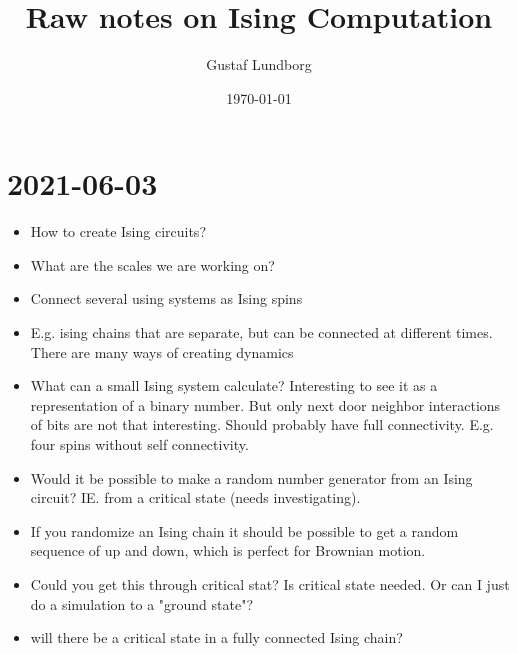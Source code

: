 \documentclass[11pt]{article}
\title{Raw notes on Ising Computation}
\author{Gustaf Lundborg}
\date{\today}
\begin{document}
\maketitle
\pagebreak



\section{2021-06-03}
\begin{itemize}
\item How to create Ising circuits?
\item What are the scales we are working on?
\item Connect several using systems as Ising spins
\item E.g. ising chains that are separate, but can be connected at different times. There are many ways of creating dynamics
\item What can a small Ising system calculate? Interesting to see it as a representation of a binary number. But only next door neighbor interactions of bits are not that interesting. Should probably have full connectivity. E.g. four spins without self connectivity.
\item Would it be possible to make a random number generator from an Ising circuit? IE. from a critical state (needs investigating).
\item If you randomize an Ising chain it should be possible to get a random sequence of up and down, which is perfect for Brownian motion.
\item Could you get this through critical stat? Is critical state needed. Or can I just do a simulation to a "ground state"?
\item will there be a critical state in a fully connected Ising chain?
\end{itemize}



\end{document}
